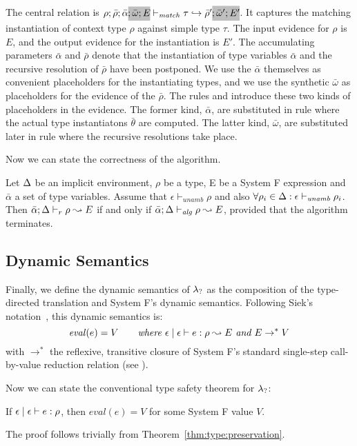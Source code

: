 The central relation is $\rho; \bar{\rho}; \bar{\alpha} \gbox{; \bar{\omega};
E}\turns_{\mathit{match}} \tau \hookrightarrow \bar{\rho}' \gbox{;
\bar{\omega}'; E'}$. It captures the matching instantiation of context type
$\rho$ against simple type $\tau$.  The input evidence for $\rho$ is $E$, and
the output evidence for the instantiation is $E'$. The accumulating parameters
$\bar{\alpha}$ and $\bar{\rho}$ denote that the instantiation of type variables
$\bar{\alpha}$ and the recursive resolution of $\bar{\rho}$ have been
postponed. We use the $\bar{\alpha}$ themselves as convenient placeholders for
the instantiating types, and we use the synthetic $\bar{\omega}$ as placeholders for
the evidence of the $\bar{\rho}$. The rules  and  
introduce these two kinds of placeholders in the evidence. The former kind, $\bar{\alpha}$,
are substituted in rule  where the actual type instantiatons $\bar{\theta}$
are computed. The latter kind, $\bar{\omega}$, are substituted later in rule  where
the recursive resolutions take place.

Now we can state the correctness of the algorithm.
\begin{theorem}
Let $\Delta$ be an implicit environment, $\rho$ be a type, E be a System F expression and $\bar{\alpha}$ a set of type variables.
Assume that $\epsilon \vdash_{\mathit{unamb}} \rho$ and also $\forall \rho_i \in \Delta: \epsilon \vdash_{\mathit{unamb}} \rho_i$.
Then $\bar{\alpha};\Delta \vdash_r \rho \leadsto E$ if and only if $\bar{\alpha};\Delta \vdash_{\mathit{alg}} \rho \leadsto E$,
provided that the algorithm terminates.
\end{theorem}

\subsection{Dynamic Semantics}
Finally, we define the dynamic semantics of $\lambda_{?}$ as the composition
of the type-directed translation and System F's dynamic semantics. 
Following Siek's notation~\cite{systemfg}, this dynamic semantics is:
\[ \mathit{eval}(e) = V \quad\quad \textit{where } \epsilon\mid\epsilon \vdash e:\rho \leadsto E \textit{ and } E \rightarrow^* V  \]
with $\rightarrow^*$ the reflexive, transitive closure of System F's standard single-step call-by-value reduction relation (see \cite[Chapter 23]{tapl}).

Now we can state the conventional type safety theorem for $\lambda_{?}$:
\begin{theorem}
If $\epsilon \mid \epsilon \vdash e:\rho$, then $\mathit{eval}(e) = V$ for
some System F value $V$.
\end{theorem}
The proof follows trivially from Theorem~\ref{thm:type:preservation}.


